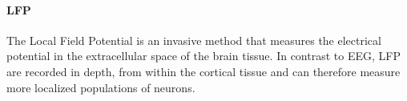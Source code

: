\paragraph{\Ac{LFP}}
The Local Field Potential is an invasive method that measures the electrical potential in the extracellular space of the brain tissue. In contrast to \ac{EEG}, \ac{LFP} are recorded in depth, from within the cortical tissue and can therefore measure more localized populations of neurons.
